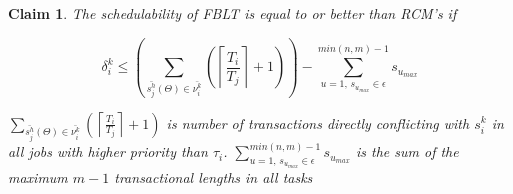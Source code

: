 \documentclass[a4paper,english]{article}
\newtheorem{clm}{Claim}
\begin{document}
\begin{clm}\label{clm:fblt_rcm}
The schedulability of FBLT is equal to or better than RCM's if 

\[
\delta_i^k\le\left(\sum_{\bar{s_{j}^{h}}(\Theta)\in\bar{\nu_{i}^{k}}}\left(\left\lceil \frac{T_{i}}{T_{j}}\right\rceil +1\right)\right)-\sum_{u=1,\,s_{u_{max}}\in \epsilon}^{min(n,m)-1} s_{u_{max}} \label{eq:fblt_rcm_comparison_16_clm}
\]

$\sum_{\bar{s_{j}^{h}}(\Theta)\in \bar{\nu_{i}^{k}}}\left(\left\lceil \frac{T_{i}}{T_{j}}\right\rceil +1\right)$ is number of transactions directly conflicting with $s_{i}^{k}$ in all jobs with higher priority than $\tau_{i}$. $\sum_{u=1,\,s_{u_{max}}\in \epsilon}^{min(n,m)-1} s_{u_{max}}$ is the sum of the maximum $m-1$ transactional lengths in all tasks
\end{clm}
%
\end{document}

